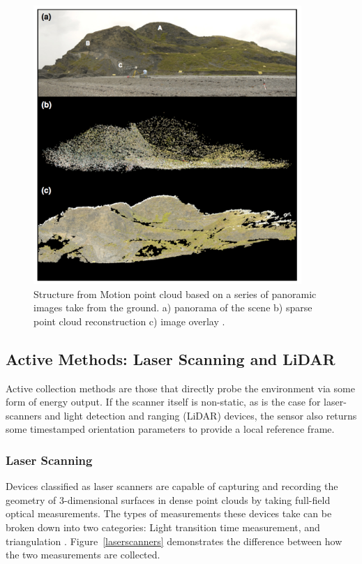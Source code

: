 \documentclass[12pt]{drexelthesis}
\let\Oldsubsection\subsection
\renewcommand{\subsection}{\FloatBarrier\Oldsubsection}
\let\Oldsubsubsection\subsubsection
\renewcommand{\subsubsection}{\FloatBarrier\Oldsubsubsection}
\begin{document}
\begin{figure}[!ht]
	\centering
	\includegraphics[width=4in]{instruments/sfmresults.png}
	\caption[Structure from Motion results]{\centering Structure from Motion point cloud based on a series of panoramic images take from the ground. a) panorama of the scene b) sparse point cloud reconstruction c) image overlay \cite{WESTOBY2012300}.}
	\label{sfm:wholedeal}
\end{figure}


\subsection{Active Methods: Laser Scanning and LiDAR}
\label{subsec:active}
Active collection methods are those that directly probe the environment via some form of energy output. If the scanner itself is non-static, as is the case for laser-scanners and light detection and ranging (LiDAR) devices, the sensor also returns some timestamped orientation parameters to provide a local reference frame.

\subsubsection{Laser Scanning}
Devices classified as laser scanners are capable of capturing and recording the geometry of 3-dimensional surfaces in dense point clouds by taking full-field optical measurements. The types of measurements these devices take can be broken down into two categories: Light transition time measurement, and triangulation \cite{basic-measurement-principles}. Figure~\ref{laserscanners} demonstrates the difference between how the two measurements are collected.
\end{document}

